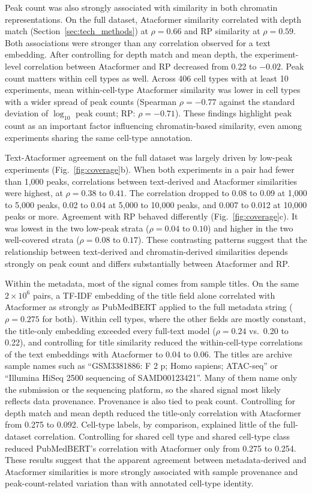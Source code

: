 \documentclass[12pt]{article}
\begin{document}
Peak count was also strongly associated with similarity in both chromatin
representations. On the full dataset, Atacformer similarity correlated with
depth match (Section~\ref{sec:tech_methods}) at $\rho = 0.66$ and RP
similarity at $\rho = 0.59$. Both associations were stronger than any
correlation observed for a text embedding. After controlling for depth match
and mean depth, the experiment-level correlation between Atacformer and RP
decreased from 0.22 to $-0.02$. Peak count matters within cell types as well.
Across 406 cell types with at least 10 experiments, mean within-cell-type
Atacformer similarity was lower in cell types with a wider spread of peak
counts (Spearman $\rho = -0.77$ against the standard deviation of
$\log_{10}$ peak count; RP: $\rho = -0.71$). These findings highlight peak
count as an important factor influencing chromatin-based similarity, even
among experiments sharing the same cell-type annotation.

Text-Atacformer agreement on the full dataset was largely driven by low-peak
experiments (Fig.~\ref{fig:coverage}b). When both experiments in a pair had
fewer than 1,000 peaks, correlations between text-derived and Atacformer
similarities were highest, at $\rho = 0.38$ to $0.41$. The correlation dropped
to 0.08 to 0.09 at 1,000 to 5,000 peaks, 0.02 to 0.04 at 5,000 to 10,000
peaks, and 0.007 to 0.012 at 10,000 peaks or more. Agreement with RP behaved
differently (Fig.~\ref{fig:coverage}c). It was lowest in the two low-peak
strata ($\rho = 0.04$ to $0.10$) and higher in the two well-covered strata
($\rho = 0.08$ to $0.17$). These contrasting patterns suggest that the
relationship between text-derived and chromatin-derived similarities depends
strongly on peak count and differs substantially between Atacformer and RP.

Within the metadata, most of the signal comes from sample titles. On the same
$2 \times 10^6$ pairs, a TF-IDF embedding of the title field alone correlated
with Atacformer as strongly as PubMedBERT applied to the full metadata string
($\rho = 0.275$ for both). Within cell types, where the other fields are
mostly constant, the title-only embedding exceeded every full-text model
($\rho = 0.24$ vs.\ 0.20 to 0.22), and controlling for title similarity
reduced the within-cell-type correlations of the text embeddings with
Atacformer to 0.04 to 0.06. The titles are archive sample names such as
``GSM3381886: F 2 p; Homo sapiens; ATAC-seq'' or ``Illumina HiSeq 2500
sequencing of SAMD00123421''. Many of them name only the submission or the
sequencing platform, so the shared signal most likely reflects data
provenance. Provenance is also tied to peak count. Controlling for depth match
and mean depth reduced the title-only correlation with Atacformer from 0.275 to
0.092. Cell-type labels, by comparison, explained little of the full-dataset
correlation. Controlling for shared cell type and shared cell-type class
reduced PubMedBERT's correlation with Atacformer only from 0.275 to 0.254.
These results suggest that the apparent agreement between metadata-derived and
Atacformer similarities is more strongly associated with sample provenance and
peak-count-related variation than with annotated cell-type identity.
\end{document}
